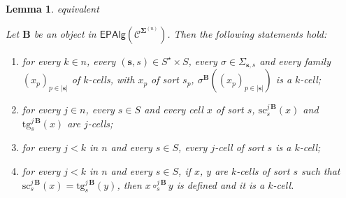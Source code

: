 \documentclass[a4paper, reqno]{amsbook}
\makeatletter
\newcommand{\bb}[1]{\ensuremath{\lvert #1 \rvert}}
\newcommand{\sig}[1]{\mathbf{#1}}             %
\newcommand{\spec}[1]{\boldsymbol{\mathcal{#1}}} %
\newcommand{\src}{\mathrm{sc}}
\newcommand{\tgt}{\mathrm{tg}}
\theoremstyle{plain}
\newtheorem{lemma}[theorem]{Lemma}
\theoremstyle{definition}
\newcommand*{\CA@leanpending}{}
\newcommand*{\CA@leanrelation}{}
\newcommand*{\lean}[2]{%
  \ifcsname\string\color@lean@#1\endcsname\else
    \PackageError{main}{Unknown relation `#1' in \string\lean}{Use equivalent, weaker or stronger.}%
  \fi
  \gdef\CA@leanrelation{#1}%
  \gdef\CA@leanpending{#2}}
\makeatother
\begin{document}
\begin{lemma}\label{LGdCells}\lean{equivalent}{Presentations.operation_isCell,Presentations.source_isCell,Presentations.target_isCell,Presentations.isFiniteCell_mono,Presentations.comp_isCell}
Let $\mathbf{B}$ be an object in $\mathsf{EPAlg}(\spec{C}^{\sig{\Sigma}^{(n)}})$.
Then the following statements hold:
\begin{enumerate}
\item for every $k\in n$, every $(\mathbf{s},s)\in S^{\star}\times S$, every $\sigma\in\Sigma_{\mathbf{s},s}$ and every family $(x_{p})_{p\in\bb{\mathbf{s}}}$ of $k$-cells, with $x_{p}$ of sort $s_{p}$, $\sigma^{\mathbf{B}}((x_{p})_{p\in\bb{\mathbf{s}}})$ is a $k$-cell;
\item for every $j\in n$, every $s\in S$ and every cell $x$ of sort $s$, $\src^{j\,\mathbf{B}}_{s}(x)$ and $\tgt^{j\,\mathbf{B}}_{s}(x)$ are $j$-cells;
\item for every $j<k$ in $n$ and every $s\in S$, every $j$-cell of sort $s$ is a $k$-cell;
\item for every $j<k$ in $n$ and every $s\in S$, if $x$, $y$ are $k$-cells of sort $s$ such that $\src^{j\,\mathbf{B}}_{s}(x)=\tgt^{j\,\mathbf{B}}_{s}(y)$, then $x\circ^{j\,\mathbf{B}}_{s}y$ is defined and it is a $k$-cell.
\end{enumerate}
\end{lemma}
\end{document}
